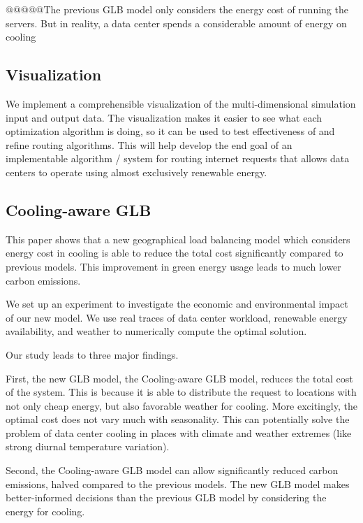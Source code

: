 \documentclass{acm_proc_article-sp}
\begin{document}
		@@@@@The previous GLB model only considers the energy cost of running the servers. But in reality, a data center spends a considerable amount of energy on cooling


\subsection{Visualization}
We implement a comprehensible visualization of the multi-dimensional simulation input and output data. The visualization makes it easier to see what each optimization algorithm is doing, so it can be used to test effectiveness of and refine routing algorithms. This will help develop the end goal of an implementable algorithm / system for routing internet requests that allows data centers to operate using almost exclusively renewable energy.

\subsection{Cooling-aware GLB}

This paper shows that a new geographical load balancing model which considers energy cost in cooling is able to reduce the total cost significantly compared to previous models. This improvement in green energy usage leads to much lower carbon emissions.

We set up an experiment to investigate the economic and environmental impact of our new model. We use real traces of data center workload, renewable energy availability, and weather to numerically compute the optimal solution.%

Our study leads to three major findings.

First, the new GLB model, the Cooling-aware GLB model, reduces the total cost of the system. This is because it is able to distribute the request to locations with not only cheap energy, but also favorable weather for cooling. More excitingly, the optimal cost does not vary much with seasonality. This can potentially solve the problem of data center cooling in places with climate and weather extremes (like strong diurnal temperature variation).

Second, the Cooling-aware GLB model can allow significantly reduced carbon emissions, halved compared to the previous models. The new GLB model makes better-informed decisions than the previous GLB model by considering the energy for cooling.
\end{document}
